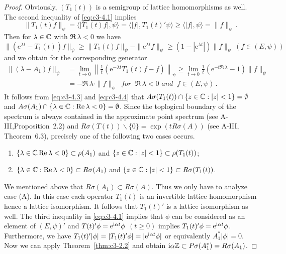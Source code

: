 \begin{proof}
	Obviously, $(T_{1}(t))$ is a semigroup of lattice homomorphisms as well. 
	The second inequality of \eqref{eq:c3-4.1} implies
	\begin{equation}\label{eq:c3-4.3}
	\|T_{1}(t)f\|_{\psi} = \langle|T_{1}(t)f|,\psi\rangle = \langle|f|,T_{1}(t)'\psi\rangle \geq \langle|f|,\psi\rangle = \|f\|_{\psi}\,.
	\end{equation}
	Then for $\lambda \in \mathbb{C} $ with $\Re\,\lambda < 0$ we have 
	\[ 
	\|(\mathrm{e}^{\lambda t}-T_{1}(t))f\|_{\psi} \geq \|T_{1}(t)f\|_{\psi}-\|\mathrm{e}^{\lambda t}f\|_{\psi} \geq (1-|\mathrm{e}^{\lambda t}|)\|f\|_{\psi} \ (f \in (E,\psi))
	\]
	and we obtain for the corresponding generator
	\begin{equation}\label{eq:c3-4.4}
		\begin{aligned}
		\|(\lambda-A_{1})f\|_{\psi} &= \lim_{t \to 0}\left\|\frac{1}{t}(\mathrm{e}^{-\lambda t}T_{1}(t)f-f)\right\|_{\psi} \geq \lim_{t \to 0}\frac{1}{t}(\mathrm{e}^{-t\Re\,\lambda}-1)\|f\|_{\psi}\\
		&= -\Re\,\lambda\cdot\|f\|_{\psi} \ \textit{ for } \ \Re\,\lambda < 0 \textit{ and } \ f \in (E,\psi)\,.
		\end{aligned}
	\end{equation}
	It follows from \eqref{eq:c3-4.3} and \eqref{eq:c3-4.4} that $A\sigma(T_{1}(t))\cap\{z \in \mathbb{C}  : |z| < 1\} = \emptyset$ and $A\sigma(A_{1})\cap\{\lambda \in \mathbb{C}  : \mathop{}\!\mathrm{Re}\,\lambda < 0\} = \emptyset$. 
	Since the toplogical boundary of the spectrum is always contained in the approximate point spectrum (see A-III,Proposition~2.2) and $R\sigma(T(t))\backslash\{0\} = \exp(tR\sigma(A))$ (see A-III, Theorem~6.3), precisely one of the following two cases occurs.
	\begin{enumerate}[\upshape (a)]
		\item
		$\{\lambda \in \mathbb{C}   \mathop{}\!\mathrm{Re}\,\lambda < 0\} \subset \rho(A_{1})$ and $\{z \in \mathbb{C}  : |z| < 1\} \subset \rho(T_{1}(t))$;
		
		\item
		$\{\lambda \in \mathbb{C}  : \mathop{}\!\mathrm{Re}\,\lambda < 0\} \subset R\sigma(A_{1})$ and $\{z \in \mathbb{C}  : |z| < 1\} \subset R\sigma(T_{1}(t))$.
	\end{enumerate}
	
	We mentioned above that $R\sigma(A_{1}) \subset R\sigma(A)$. 
	Thus we only have to analyze case (A). 
	In this case each operator $T_{1}(t)$ is an invertible lattice homomorphism hence a lattice isomorphism. 
	It follows that $T_{1}(t)'$ is a lattice isomorphism as well. 
	The third inequality in \eqref{eq:c3-4.1} implies that $\phi$ can be considered as an element of $(E,\psi)'$ and $T(t)'\phi = \mathrm{e}^{\mathrm{i}\alpha t}\phi$ $(t \geq 0)$ implies $T_{1}(t)'\phi = \mathrm{e}^{\mathrm{i}\alpha t}\phi$. 
	Furthermore, we have
	$T_{1}(t)'|\phi| = |T_{1}(t)'\phi| = |\mathrm{e}^{\mathrm{i}\alpha t}\phi|$ or equivalently $A_{1}^*|\phi| = 0$.
	Now we can apply 
	Theorem~\ref{thm:c3-2.2} 
	and obtain $\mathrm{i}\alpha\mathbb{Z} \subset P\sigma(A_{1}^*) = R\sigma(A_{1})$.
	\end{proof}

